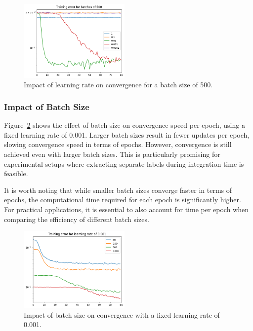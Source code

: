 \documentclass[english]{article}
\begin{document}
\begin{figure}[H]
    \centering
    \includegraphics[width=0.48\textwidth]{rsc/class-batch-avg/lr_sweep.png}
    \caption{Impact of learning rate on convergence for a batch size of 500.}
    \label{fig:lr_sweep}
\end{figure}

\subsubsection{Impact of Batch Size}

Figure~\ref{fig:batch_sweep} shows the effect of batch size on convergence speed per epoch, using a fixed learning rate of 0.001. Larger batch sizes result in fewer updates per epoch, slowing convergence speed in terms of epochs. However, convergence is still achieved even with larger batch sizes. This is particularly promising for experimental setups where extracting separate labels during integration time is feasible.

It is worth noting that while smaller batch sizes converge faster in terms of epochs, the computational time required for each epoch is significantly higher. For practical applications, it is essential to also account for time per epoch when comparing the efficiency of different batch sizes.

\begin{figure}[H]
    \centering
    \includegraphics[width=0.48\textwidth]{rsc/class-batch-avg/batch_sweep.png}
    \caption{Impact of batch size on convergence with a fixed learning rate of 0.001.}
    \label{fig:batch_sweep}
\end{figure}
\end{document}

